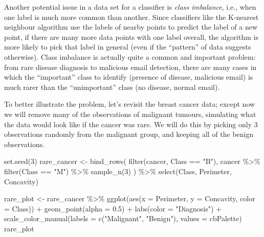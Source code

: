 \documentclass[
]{krantz}
\makeatletter
\newenvironment{Shaded}{\begin{snugshade}}{\end{snugshade}}
\newcommand{\AttributeTok}[1]{\textcolor[rgb]{0.61,0.61,0.61}{#1}}
\newcommand{\DecValTok}[1]{\textcolor[rgb]{0.06,0.06,0.06}{#1}}
\newcommand{\FloatTok}[1]{\textcolor[rgb]{0.06,0.06,0.06}{#1}}
\newcommand{\FunctionTok}[1]{\textcolor[rgb]{0,0,0}{#1}}
\newcommand{\NormalTok}[1]{#1}
\newcommand{\OtherTok}[1]{\textcolor[rgb]{0.37,0.37,0.37}{#1}}
\newcommand{\SpecialCharTok}[1]{\textcolor[rgb]{0,0,0}{#1}}
\newcommand{\StringTok}[1]{\textcolor[rgb]{0.5,0.5,0.5}{#1}}
\newenvironment{kframe}{%
\medskip{}
\setlength{\fboxsep}{.8em}
 \def\at@end@of@kframe{}%
 \ifinner\ifhmode%
  \def\at@end@of@kframe{\end{minipage}}%
  \begin{minipage}{\columnwidth}%
 \fi\fi%
 \def\FrameCommand##1{\hskip\@totalleftmargin \hskip-\fboxsep
 \colorbox{shadecolor}{##1}\hskip-\fboxsep
     \hskip-\linewidth \hskip-\@totalleftmargin \hskip\columnwidth}%
 \MakeFramed {\advance\hsize-\width
   \@totalleftmargin\z@ \linewidth\hsize
   \@setminipage}}%
 {\par\unskip\endMakeFramed%
 \at@end@of@kframe}
\renewenvironment{Shaded}{\begin{kframe}}{\end{kframe}}
\makeatother
\begin{document}
Another potential issue in a data set for a classifier is \emph{class imbalance},
i.e., when one label is much more common than another. Since classifiers like
the K-nearest neighbour algorithm use the labels of nearby points to predict
the label of a new point, if there are many more data points with one label
overall, the algorithm is more likely to pick that label in general (even if
the ``pattern'' of data suggests otherwise). Class imbalance is actually quite a
common and important problem: from rare disease diagnosis to malicious email
detection, there are many cases in which the ``important'' class to identify
(presence of disease, malicious email) is much rarer than the ``unimportant''
class (no disease, normal email).

To better illustrate the problem, let's revisit the breast cancer data; except
now we will remove many of the observations of malignant tumours, simulating
what the data would look like if the cancer was rare. We will do this by
picking only 3 observations randomly from the malignant group, and keeping all
of the benign observations.

\begin{Shaded}
\begin{Highlighting}[]
\FunctionTok{set.seed}\NormalTok{(}\DecValTok{3}\NormalTok{)}
\NormalTok{rare\_cancer }\OtherTok{\textless{}{-}} \FunctionTok{bind\_rows}\NormalTok{(}
  \FunctionTok{filter}\NormalTok{(cancer, Class }\SpecialCharTok{==} \StringTok{"B"}\NormalTok{),}
\NormalTok{  cancer }\SpecialCharTok{\%\textgreater{}\%} \FunctionTok{filter}\NormalTok{(Class }\SpecialCharTok{==} \StringTok{"M"}\NormalTok{) }\SpecialCharTok{\%\textgreater{}\%} \FunctionTok{sample\_n}\NormalTok{(}\DecValTok{3}\NormalTok{)}
\NormalTok{) }\SpecialCharTok{\%\textgreater{}\%}
  \FunctionTok{select}\NormalTok{(Class, Perimeter, Concavity)}

\NormalTok{rare\_plot }\OtherTok{\textless{}{-}}\NormalTok{ rare\_cancer }\SpecialCharTok{\%\textgreater{}\%}
  \FunctionTok{ggplot}\NormalTok{(}\FunctionTok{aes}\NormalTok{(}\AttributeTok{x =}\NormalTok{ Perimeter, }\AttributeTok{y =}\NormalTok{ Concavity, }\AttributeTok{color =}\NormalTok{ Class)) }\SpecialCharTok{+}
  \FunctionTok{geom\_point}\NormalTok{(}\AttributeTok{alpha =} \FloatTok{0.5}\NormalTok{) }\SpecialCharTok{+}
  \FunctionTok{labs}\NormalTok{(}\AttributeTok{color =} \StringTok{"Diagnosis"}\NormalTok{) }\SpecialCharTok{+}
  \FunctionTok{scale\_color\_manual}\NormalTok{(}\AttributeTok{labels =} \FunctionTok{c}\NormalTok{(}\StringTok{"Malignant"}\NormalTok{, }\StringTok{"Benign"}\NormalTok{), }\AttributeTok{values =}\NormalTok{ cbPalette)}
\NormalTok{rare\_plot}
\end{Highlighting}
\end{Shaded}
\end{document}
